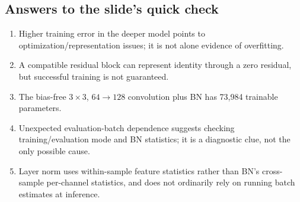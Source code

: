 \subsection{Answers to the slide's quick check}
\begin{enumerate}
\item Higher training error in the deeper model points to optimization/representation issues; it is not alone evidence of overfitting.
\item A compatible residual block can represent identity through a zero residual, but successful training is not guaranteed.
\item The bias-free $3\times3$, $64\to128$ convolution plus BN has 73,984 trainable parameters.
\item Unexpected evaluation-batch dependence suggests checking training/evaluation mode and BN statistics; it is a diagnostic clue, not the only possible cause.
\item Layer norm uses within-sample feature statistics rather than BN's cross-sample per-channel statistics, and does not ordinarily rely on running batch estimates at inference.
\end{enumerate}
